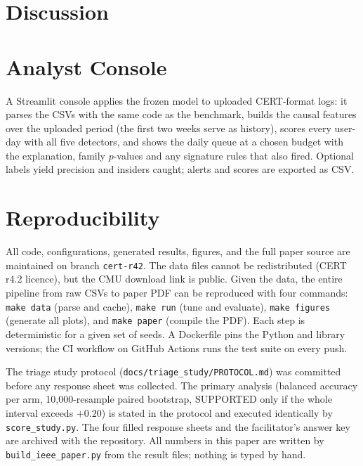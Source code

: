 \documentclass[conference]{IEEEtran}
\begin{document}


\section{Discussion}


\section{Analyst Console}
A Streamlit console applies the frozen model to uploaded CERT-format logs: it parses the CSVs with
the same code as the benchmark, builds the causal features over the uploaded period (the first two
weeks serve as history), scores every user-day with all five detectors, and shows the daily queue
at a chosen budget with the explanation, family $p$-values and any signature rules that also fired.
Optional labels yield precision and insiders caught; alerts and scores are exported as CSV.

\section{Reproducibility}
All code, configurations, generated results, figures, and the full paper source are maintained on
branch \texttt{cert-r42}. The data files cannot be redistributed (CERT r4.2 licence), but the
CMU download link is public. Given the data, the entire pipeline from raw CSVs to paper PDF can
be reproduced with four commands: \texttt{make data} (parse and cache), \texttt{make run} (tune
and evaluate), \texttt{make figures} (generate all plots), and \texttt{make paper} (compile the
PDF). Each step is deterministic for a given set of seeds. A Dockerfile pins the Python and
library versions; the CI workflow on GitHub Actions runs the test suite on every push.

The triage study protocol (\texttt{docs/triage\_study/PROTOCOL.md}) was committed before any
response sheet was collected. The primary analysis (balanced accuracy per arm, 10{,}000-resample
paired bootstrap, SUPPORTED only if the whole interval exceeds $+0.20$) is stated in the protocol
and executed identically by \texttt{score\_study.py}. The four filled response sheets and the
facilitator's answer key are archived with the repository. All numbers in this paper are written
by \texttt{build\_ieee\_paper.py} from the result files; nothing is typed by hand.
\end{document}
